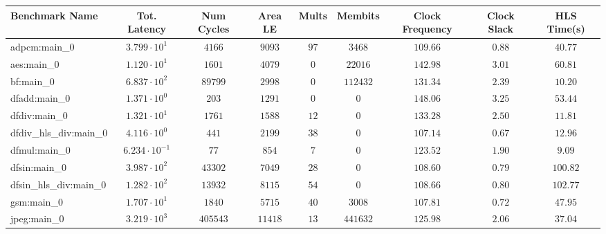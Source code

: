 \begin{tabular}{|l|c|c|c|c|c|c|c|c|}
\hline
Benchmark Name          & Tot. Latency            & Num Cycles & Area LE   & Mults   & Membits    & Clock Frequency & Clock Slack & HLS Time(s) \\
\hline
adpcm:main\_0           & $ 3.799 \cdot 10^{1}  $ & $ 4166   $ & $ 9093  $ & $ 97  $ & $ 3468   $ & $ 109.66      $ & $ 0.88    $ & $ 40.77   $ \\
aes:main\_0             & $ 1.120 \cdot 10^{1}  $ & $ 1601   $ & $ 4079  $ & $ 0   $ & $ 22016  $ & $ 142.98      $ & $ 3.01    $ & $ 60.81   $ \\
bf:main\_0              & $ 6.837 \cdot 10^{2}  $ & $ 89799  $ & $ 2998  $ & $ 0   $ & $ 112432 $ & $ 131.34      $ & $ 2.39    $ & $ 10.20   $ \\
dfadd:main\_0           & $ 1.371 \cdot 10^{0}  $ & $ 203    $ & $ 1291  $ & $ 0   $ & $ 0      $ & $ 148.06      $ & $ 3.25    $ & $ 53.44   $ \\
dfdiv:main\_0           & $ 1.321 \cdot 10^{1}  $ & $ 1761   $ & $ 1588  $ & $ 12  $ & $ 0      $ & $ 133.28      $ & $ 2.50    $ & $ 11.81   $ \\
dfdiv\_hls\_div:main\_0 & $ 4.116 \cdot 10^{0}  $ & $ 441    $ & $ 2199  $ & $ 38  $ & $ 0      $ & $ 107.14      $ & $ 0.67    $ & $ 12.96   $ \\
dfmul:main\_0           & $ 6.234 \cdot 10^{-1} $ & $ 77     $ & $ 854   $ & $ 7   $ & $ 0      $ & $ 123.52      $ & $ 1.90    $ & $ 9.09    $ \\
dfsin:main\_0           & $ 3.987 \cdot 10^{2}  $ & $ 43302  $ & $ 7049  $ & $ 28  $ & $ 0      $ & $ 108.60      $ & $ 0.79    $ & $ 100.82  $ \\
dfsin\_hls\_div:main\_0 & $ 1.282 \cdot 10^{2}  $ & $ 13932  $ & $ 8115  $ & $ 54  $ & $ 0      $ & $ 108.66      $ & $ 0.80    $ & $ 102.77  $ \\
gsm:main\_0             & $ 1.707 \cdot 10^{1}  $ & $ 1840   $ & $ 5715  $ & $ 40  $ & $ 3008   $ & $ 107.81      $ & $ 0.72    $ & $ 47.95   $ \\
jpeg:main\_0            & $ 3.219 \cdot 10^{3}  $ & $ 405543 $ & $ 11418 $ & $ 13  $ & $ 441632 $ & $ 125.98      $ & $ 2.06    $ & $ 37.04   $ \\

\end{tabular}
